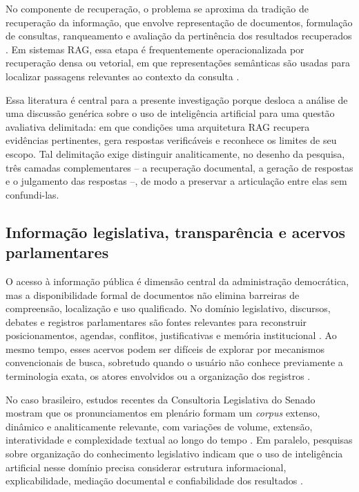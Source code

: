 No componente de recuperação, o problema se aproxima da tradição de recuperação da informação, que envolve representação de documentos, formulação de consultas, ranqueamento e avaliação da pertinência dos resultados recuperados \parencite{manningEtAl2008informationRetrieval}. Em sistemas RAG, essa etapa é frequentemente operacionalizada por recuperação densa ou vetorial, em que representações semânticas são usadas para localizar passagens relevantes ao contexto da consulta \parencite{karpukhinEtAl2020dpr,thakurEtAl2021beir}.

Essa literatura é central para a presente investigação porque desloca a análise de uma discussão genérica sobre o uso de inteligência artificial para uma questão avaliativa delimitada: em que condições uma arquitetura RAG recupera evidências pertinentes, gera respostas verificáveis e reconhece os limites de seu escopo. Tal delimitação exige distinguir analiticamente, no desenho da pesquisa, três camadas complementares -- a recuperação documental, a geração de respostas e o julgamento das respostas --, de modo a preservar a articulação entre elas sem confundi-las. 

\subsection{Informação legislativa, transparência e acervos parlamentares}

O acesso à informação pública é dimensão central da administração democrática, mas a disponibilidade formal de documentos não elimina barreiras de compreensão, localização e uso qualificado. No domínio legislativo, discursos, debates e registros parlamentares são fontes relevantes para reconstruir posicionamentos, agendas, conflitos, justificativas e memória institucional \parencite{skubicFiser2024discourseReview}. Ao mesmo tempo, esses acervos podem ser difíceis de explorar por mecanismos convencionais de busca, sobretudo quando o usuário não conhece previamente a terminologia exata, os atores envolvidos ou a organização dos registros \parencite{bandeiraBernardes2016information}.

No caso brasileiro, estudos recentes da Consultoria Legislativa do Senado mostram que os pronunciamentos em plenário formam um \textit{corpus} extenso, dinâmico e analiticamente relevante, com variações de volume, extensão, interatividade e complexidade textual ao longo do tempo \parencite{blanco2025plenarioPalanqueEstudio,blanco2026letrasGraudas}. Em paralelo, pesquisas sobre organização do conhecimento legislativo indicam que o uso de inteligência artificial nesse domínio precisa considerar estrutura informacional, explicabilidade, mediação documental e confiabilidade dos resultados \parencite{martelloteViola2025organizacaoConhecimento}.

